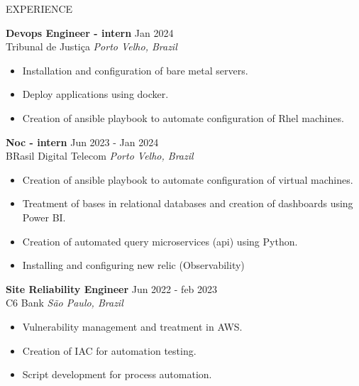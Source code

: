\documentclass{resume} %
\begin{document}
\begin{rSection}{EXPERIENCE}

\textbf{Devops Engineer - intern} \hfill Jan 2024 \\
Tribunal de Justiça \hfill \textit{Porto Velho, Brazil}
 \begin{itemize}
    \itemsep -3pt {} 
     \item Installation and configuration of bare metal servers.
     \item Deploy applications using docker.
    \item Creation of ansible playbook to automate configuration of Rhel machines. 
 \end{itemize}
 
\textbf{Noc - intern} \hfill Jun 2023 - Jan 2024\\
BRasil Digital Telecom \hfill \textit{Porto Velho, Brazil}
 \begin{itemize}
    \itemsep -3pt {} 
     \item Creation of ansible playbook to automate configuration of virtual machines.
     \item Treatment of bases in relational databases and creation of dashboards using Power BI.
    \item Creation of automated query microservices (api) using Python. 
    \item Installing and configuring new relic (Observability)
 \end{itemize}
 
\textbf{Site Reliability Engineer} \hfill Jun 2022 - feb 2023\\
C6 Bank \hfill \textit{São Paulo, Brazil}
 \begin{itemize}
    \itemsep -3pt {} 
     \item Vulnerability management and treatment in AWS.
     \item Creation of IAC for automation testing.
    \item Script development for process automation.
 \end{itemize}

\end{rSection} 

\end{document}
